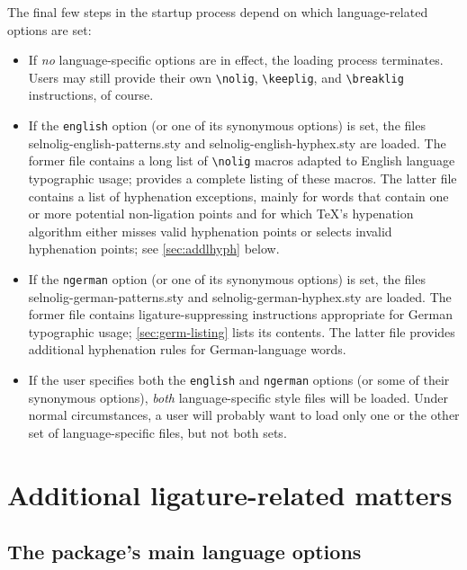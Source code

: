 \documentclass[11pt]{article}
\newcommand{\pkg}[1]{\textsf{#1}}
\newcommand{\opt}[1]{\texttt{#1}}
\newcommand{\cmmd}[1]{\texttt{\textbackslash #1}}
\begin{document}
The final few steps in the startup process depend on which language-related options are set:
\begin{itemize}
\item If \emph{no} language-specific options are in effect, the loading process terminates. Users may still provide their own \cmmd{nolig}, \cmmd{keeplig}, and \cmmd{breaklig} instructions, of course.

\item If the \opt{english} option (or one of its synonymous options) is set, the files \pkg{selnolig-english-patterns.sty} and \pkg{selnolig-english-hyphex.sty} are loaded. The former file contains a long list of \cmmd{nolig} macros adapted to English language typographic usage;  provides a complete listing of these macros. The latter file contains a list of hyphenation exceptions, mainly for words that contain one or more potential non-ligation points and for which \TeX's hypenation algorithm either misses valid hyphenation points or selects invalid hyphenation points; see \cref{sec:addlhyph} below.

\item If the \opt{ngerman} option (or one of its synonymous options) is set, the files \pkg{selnolig-german-patterns.sty} and \pkg{selnolig-german-hyphex.sty} are loaded. The former file contains ligature-suppressing instructions appropriate for German typographic usage; \cref{sec:germ-listing} lists its contents. The latter file provides additional hyphenation rules for German-language words.

\item If the user specifies both the \opt{english} and \opt{ngerman} options (or some of their synonymous options), \emph{both} language-specific style files will be loaded. Under normal circumstances, a user will probably want to load only one or the other set of language-specific files, but not both sets.
\end{itemize}



\section{Additional ligature-related matters}
\label{sec:options}


\subsection{The package's main language options}
\end{document}
